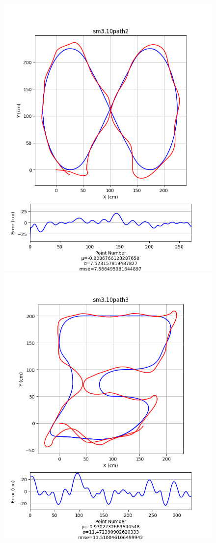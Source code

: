\documentclass[mla7]{mla}
\begin{document}
\begin{paper}
\begin{figure}[H]
\includegraphics[width=\linewidth]{pathData/smpath2}
\endminipage\\
\includegraphics[width=\linewidth]{pathData/smpath3}

\end{figure}
\end{paper}
\end{document}
